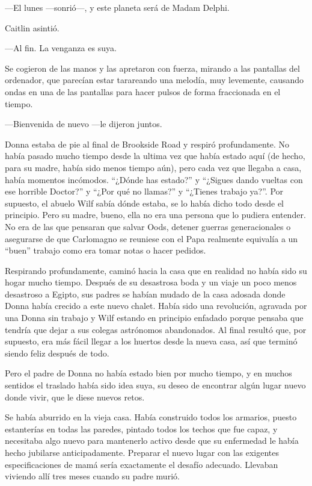 ---El lunes ---sonrió---, y este planeta será de Madam Delphi.

Caitlin asintió.

---Al fin. La venganza es suya.

Se cogieron de las manos y las apretaron con fuerza, mirando a las
pantallas del ordenador, que parecían estar tarareando una melodía, muy
levemente, causando ondas en una de las pantallas para hacer pulsos de
forma fraccionada en el tiempo.

---Bienvenida de nuevo ---le dijeron juntos.

Donna estaba de pie al final de Brookside Road y respiró profundamente.
No había pasado mucho tiempo desde la ultima vez que había estado aquí
(de hecho, para su madre, había sido menos tiempo aún), pero cada vez
que llegaba a casa, había momentos incómodos. ``¿Dónde has estado?'' y
``¿Sigues dando vueltas con ese horrible Doctor?'' y ``¿Por qué no
llamas?'' y ``¿Tienes trabajo ya?''. Por supuesto, el abuelo Wilf sabía
dónde estaba, se lo había dicho todo desde el principio. Pero su madre,
bueno, ella no era una persona que lo pudiera entender. No era de las
que pensaran que salvar Oods, detener guerras generacionales o
asegurarse de que Carlomagno se reuniese con el Papa realmente equivalía
a un ``buen'' trabajo como era tomar notas o hacer pedidos.

Respirando profundamente, caminó hacia la casa que en realidad no había
sido su hogar mucho tiempo. Después de su desastrosa boda y un viaje un
poco menos desastroso a Egipto, sus padres se habían mudado de la casa
adosada donde Donna había crecido a este nuevo chalet. Había sido una
revolución, agravada por una Donna sin trabajo y Wilf estando en
principio enfadado porque pensaba que tendría que dejar a sus colegas
astrónomos abandonados. Al final resultó que, por supuesto, era más
fácil llegar a los huertos desde la nueva casa, así que terminó siendo
feliz después de todo.

Pero el padre de Donna no había estado bien por mucho tiempo, y en
muchos sentidos el traslado había sido idea suya, su deseo de encontrar
algún lugar nuevo donde vivir, que le diese nuevos retos.

Se había aburrido en la vieja casa. Había construido todos los armarios,
puesto estanterías en todas las paredes, pintado todos los techos que
fue capaz, y necesitaba algo nuevo para mantenerlo activo desde que su
enfermedad le había hecho jubilarse anticipadamente. Preparar el nuevo
lugar con las exigentes especificaciones de mamá sería exactamente el
desafío adecuado. Llevaban viviendo allí tres meses cuando su padre
murió.

